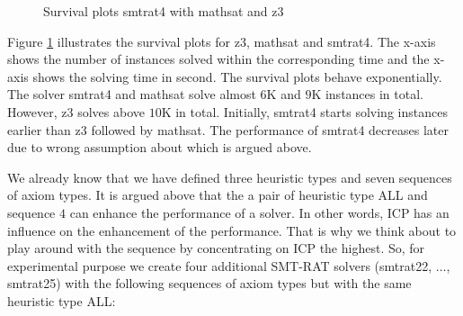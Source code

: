 \begin{figure}
\caption{Survival plots smtrat4 with mathsat and z3} 
\label{fig:Survival_plots_smtrat4} 
\end{figure}

\noindent Figure \ref{fig:Survival_plots_smtrat4} illustrates the survival plots for z3, mathsat and smtrat4.
The x-axis shows the number of instances solved within the corresponding time and the x-axis shows the solving time in second.
The survival plots behave exponentially.
The solver smtrat4 and mathsat solve almost $6$K and $9$K instances in total.
However, z3 solves above $10$K in total.
Initially, smtrat4 starts solving instances earlier than z3 followed by mathsat.
The performance of smtrat4 decreases later due to wrong assumption about which is argued above.\newline

\noindent We already know that we have defined three heuristic types and seven sequences of axiom types.
It is argued above that the a pair of heuristic type ALL and sequence $4$ can enhance the performance of a solver.
In other words, ICP has an influence on the enhancement of the performance.
That is why we think about to play around with the sequence by concentrating on ICP the highest.
So, for experimental purpose we create four additional SMT-RAT solvers (smtrat22, $\dots$, smtrat25) with the following sequences of axiom types but with the same heuristic type ALL:

